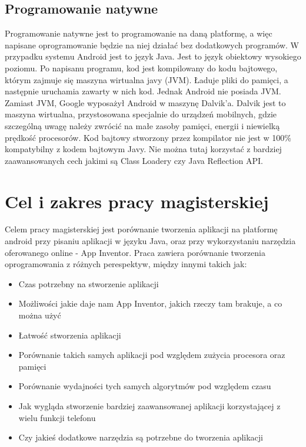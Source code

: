 \subsection{Programowanie natywne}
\label{c112}

Programowanie natywne jest to programowanie na daną platformę, a więc napisane oprogramowanie będzie na niej działać bez dodatkowych programów. W przypadku systemu Android jest to język Java. Jest to język obiektowy wysokiego poziomu. Po napisanu programu, kod jest kompilowany do kodu bajtowego, którym zajmuje się maszyna wirtualna javy (JVM). Ładuje pliki do pamięci, a następnie uruchamia zawarty w nich kod. Jednak Android nie posiada JVM. Zamiast JVM, Google wyposażył Android w maszynę Dalvik'a. Dalvik jest to maszyna wirtualna, przystosowana specjalnie do urządzeń mobilnych, gdzie szczególną uwagę należy zwrócić na małe zasoby pamięci, energii i niewielką prędkość procesorów. Kod bajtowy stworzony przez kompilator nie jest w 100\% kompatybilny z kodem bajtowym Javy. Nie można tutaj korzystać z bardziej zaawansowanych cech jakimi są Class Loadery czy Java Reflection API. \cite{gphone:dalvik}

\section{Cel i zakres pracy magisterskiej}
\label{c12}

Celem pracy magisterskiej jest porównanie tworzenia aplikacji na platformę android przy pisaniu aplikacji w języku Java, oraz przy wykorzystaniu narzędzia oferowanego online - App Inventor. Praca zawiera porównanie tworzenia oprogramowania z różnych perespektyw, między innymi takich jak:
\begin{itemize}
\item Czas potrzebny na stworzenie aplikacji
\item Możliwości jakie daje nam App Inventor, jakich rzeczy tam brakuje, a co można użyć
\item Łatwość stworzenia aplikacji
\item Porównanie takich samych aplikacji pod względem zużycia procesora oraz pamięci
\item Porównanie wydajności tych samych algorytmów pod względem czasu
\item Jak wygląda stworzenie bardziej zaawansowanej aplikacji korzystającej z wielu funkcji telefonu
\item Czy jakieś dodatkowe narzędzia są potrzebne do tworzenia aplikacji
\end{itemize}

